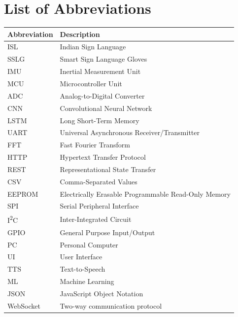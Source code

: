 \documentclass[12pt,a4paper]{report}
\begin{document}

\newpage
\chapter*{List of Abbreviations}

\begin{table}[H]
  \centering
  \begin{tabular}{>{\raggedright\arraybackslash}p{} >{\raggedright\arraybackslash}p{}}
    \toprule
    \textbf{Abbreviation} & \textbf{Description} \\
    \midrule
    ISL & Indian Sign Language \\
    SSLG & Smart Sign Language Gloves \\
    IMU & Inertial Measurement Unit \\
    MCU & Microcontroller Unit \\
    ADC & Analog-to-Digital Converter \\
    CNN & Convolutional Neural Network \\
    LSTM & Long Short-Term Memory \\
    UART & Universal Asynchronous Receiver/Transmitter \\
    FFT & Fast Fourier Transform \\
    HTTP & Hypertext Transfer Protocol \\
    REST & Representational State Transfer \\
    CSV & Comma-Separated Values \\
    EEPROM & Electrically Erasable Programmable Read-Only Memory \\
    SPI & Serial Peripheral Interface \\
    I\textsuperscript{2}C & Inter-Integrated Circuit \\
    GPIO & General Purpose Input/Output \\
    PC & Personal Computer \\
    UI & User Interface \\
    TTS & Text-to-Speech \\
    ML & Machine Learning \\
    JSON & JavaScript Object Notation \\
    WebSocket & Two-way communication protocol \\
    \bottomrule
  \end{tabular}
\end{table}
\end{document}
